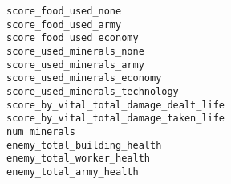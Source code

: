 \begin{description}
    \item[\texttt{score\_food\_used\_none}] 
    \item[\texttt{score\_food\_used\_army}] 
    \item[\texttt{score\_food\_used\_economy}] 
    \item[\texttt{score\_used\_minerals\_none}] 
    \item[\texttt{score\_used\_minerals\_army}] 
    \item[\texttt{score\_used\_minerals\_economy}] 
    \item[\texttt{score\_used\_minerals\_technology}] 
    \item[\texttt{score\_by\_vital\_total\_damage\_dealt\_life}] 
    \item[\texttt{score\_by\_vital\_total\_damage\_taken\_life}] 
    \item[\texttt{num\_minerals}] 
    \item[\texttt{enemy\_total\_building\_health}] 
    \item[\texttt{enemy\_total\_worker\_health}] 
    \item[\texttt{enemy\_total\_army\_health}] 
\end{description}